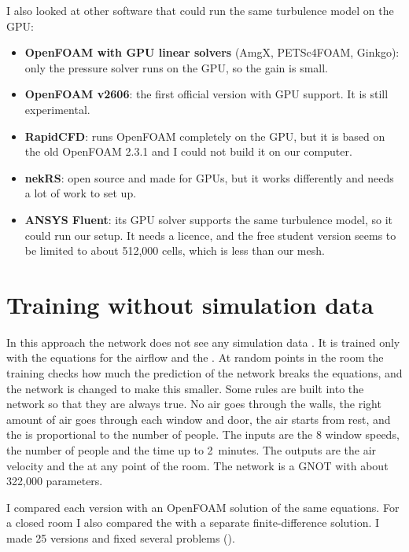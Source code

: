 I also looked at other software that could run the same turbulence model on the GPU:
\begin{itemize}
  \item \textbf{OpenFOAM with GPU linear solvers} (AmgX, PETSc4FOAM, Ginkgo): only the pressure solver runs on
        the GPU, so the gain is small.
  \item \textbf{OpenFOAM v2606}: the first official version with GPU support. It is still experimental.
  \item \textbf{RapidCFD}: runs OpenFOAM completely on the GPU, but it is based on the old OpenFOAM 2.3.1 and
        I could not build it on our computer.
  \item \textbf{nekRS}: open source and made for GPUs, but it works differently and needs a lot of work to
        set up.
  \item \textbf{ANSYS Fluent}: its GPU solver supports the same turbulence model, so it could run our setup.
        It needs a licence, and the free student version seems to be limited to about 512,000 cells, which is
        less than our mesh.
\end{itemize}

\section{Training without simulation data}
In this approach the network does not see any simulation data \citep{raissi2019,li2021pino}. It is trained
only with the equations for the airflow and the \cotwo{}. At random points in the room the training checks how
much the prediction of the network breaks the equations, and the network is changed to make this smaller.
Some rules are built into the network so that they are always true. No air goes through the walls, the right
amount of air goes through each window and door, the air starts from rest, and the \cotwo{} is proportional to
the number of people. The inputs are the 8 window speeds, the number of people and the time up to 2~minutes.
The outputs are the air velocity and the \cotwo{} at any point of the room. The network is a GNOT with about
322,000 parameters.

I compared each version with an OpenFOAM solution of the same equations. For a closed room I also compared
the \cotwo{} with a separate finite-difference solution. I made 25 versions and fixed several problems
().

